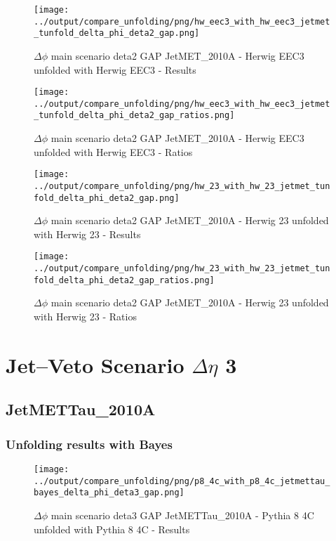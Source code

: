 \documentclass[11pt]{book}
\begin{document}
\begin{figure}[ht]
\centering
\texttt{[image: ../output/compare\_unfolding/png/hw\_eec3\_with\_hw\_eec3\_jetmet\_tunfold\_delta\_phi\_deta2\_gap.png]}
\caption{$\Delta\phi$ main scenario deta2 GAP JetMET\_2010A - Herwig EEC3 unfolded with Herwig EEC3 - Results}
\label{hw_eec3_hw_eec3_jetmet_tunfold_delta_phi_deta2_gap_a}
\end{figure}

\begin{figure}[ht]
\centering
\texttt{[image: ../output/compare\_unfolding/png/hw\_eec3\_with\_hw\_eec3\_jetmet\_tunfold\_delta\_phi\_deta2\_gap\_ratios.png]}
\caption{$\Delta\phi$ main scenario deta2 GAP JetMET\_2010A - Herwig EEC3 unfolded with Herwig EEC3 - Ratios}
\label{hw_eec3_hw_eec3_jetmet_tunfold_delta_phi_deta2_gap_b}
\end{figure}

\begin{figure}[ht]
\centering
\texttt{[image: ../output/compare\_unfolding/png/hw\_23\_with\_hw\_23\_jetmet\_tunfold\_delta\_phi\_deta2\_gap.png]}
\caption{$\Delta\phi$ main scenario deta2 GAP JetMET\_2010A - Herwig 23 unfolded with Herwig 23 - Results}
\label{hw_23_hw_23_jetmet_tunfold_delta_phi_deta2_gap_a}
\end{figure}

\begin{figure}[ht]
\centering
\texttt{[image: ../output/compare\_unfolding/png/hw\_23\_with\_hw\_23\_jetmet\_tunfold\_delta\_phi\_deta2\_gap\_ratios.png]}
\caption{$\Delta\phi$ main scenario deta2 GAP JetMET\_2010A - Herwig 23 unfolded with Herwig 23 - Ratios}
\label{hw_23_hw_23_jetmet_tunfold_delta_phi_deta2_gap_b}
\end{figure}




\newpage
\chapter{Jet--Veto Scenario $\Delta\eta$ 3}
\section{JetMETTau\_2010A}
\subsection{Unfolding results with Bayes}

\begin{figure}[ht]
\centering
\texttt{[image: ../output/compare\_unfolding/png/p8\_4c\_with\_p8\_4c\_jetmettau\_bayes\_delta\_phi\_deta3\_gap.png]}
\caption{$\Delta\phi$ main scenario deta3 GAP JetMETTau\_2010A - Pythia 8 4C unfolded with Pythia 8 4C - Results}
\label{p8_p8_jetmettau_bayes_delta_phi_deta3_gap_a}
\end{figure}
\end{document}
